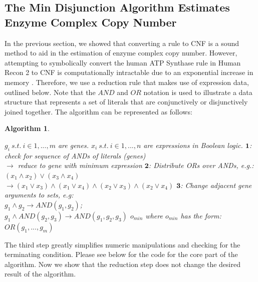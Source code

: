\documentclass[phd,tocprelim]{cornell}
\theoremstyle{break}
\newtheorem{Algorithm}{Algorithm}
\theoremstyle{empty}
\begin{document}
\subsection{The Min Disjunction Algorithm Estimates \\Enzyme Complex Copy Number}

In the previous section, we showed that converting a rule to CNF is a
sound method to aid in the estimation of enzyme complex copy number.
However, attempting to symbolically convert the human ATP Synthase rule in
Human Recon 2 to CNF is computationally intractable due to an
exponential increase in memory \cite{Thiele2013}. Therefore, we use a
reduction rule that makes use of expression data, outlined below.
Note that the $AND$ and $OR$ notation is used to illustrate a
data structure that represents a set of literals that are
conjunctively or disjunctively joined together. The algorithm can be
represented as follows: \\

\pagebreak
\begin{Algorithm}
\label{alg:ReductionToCNF}
\begin{algorithmic}
\REQUIRE $g_i~s.t.~i \in{1, ..., m}$ are genes. 
\REQUIRE $x_i~s.t.~i \in{1, ..., n}$ are expressions in Boolean logic.
  \STATE $\mathbf{1}$: check for sequence of ANDs of literals (genes)\\ 
    \hspace{4.8 mm} $\rightarrow$ reduce to gene with minimum expression 
  \STATE $\mathbf{2}$: Distribute ORs over ANDs, e.g.: $(x_1 \land x_2) \lor (x_3 \land x_4)$ \\ 
    \hspace{4.8 mm} $\rightarrow (x_1 \lor x_3) \land (x_1 \lor x_4) \land (x_2 \lor x_3) \land (x_2 \lor x_4)$
  \STATE $\mathbf{3}$: Change adjacent gene arguments to sets, e.g: \\
    \hspace{4.8 mm} $g_1 \land g_2 \rightarrow AND(g_1,g_2)$;  \\
    \hspace{4.8 mm} $g_1 \land AND(g_2,g_3) \rightarrow AND(g_1,g_2,g_3)$ 
\ENDWHILE
\ENSURE $o_{min}$ where $o_{min}$ has the form: $OR(g_1,...,g_m)$
\end{algorithmic} 
\end{Algorithm}

The third step greatly simplifies numeric manipulations and checking
for the terminating condition. Please see below for the code for the
core part of the algorithm. Now we show that the reduction step does
not change the desired result of the algorithm.
\end{document}
